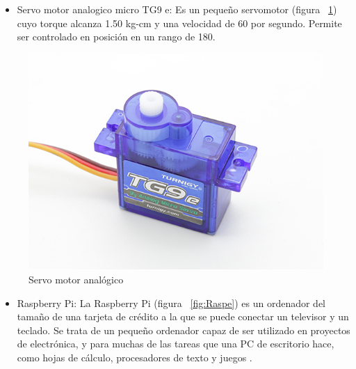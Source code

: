 \begin{itemize}
\item Servo motor analogico micro TG9 e: Es un pequeño servomotor  (figura ~\ref{fig:Servo}) cuyo torque alcanza 1.50 kg-cm y una velocidad de 60 por
segundo. Permite ser controlado en posición en un rango de 180. \cite{microservo}  

\end{itemize}

\begin{figure}[hbtp]
\centering
\label{fig:Servo}
\includegraphics[scale=0.3]{imagenes/turnigy.jpg}
\caption{Servo motor analógico}
\end{figure}

\begin{itemize}
\item Raspberry Pi: La Raspberry Pi (figura ~\ref{fig:Raspe}) es un ordenador del tamaño de una tarjeta de crédito a la que se puede conectar un 
televisor y un teclado. Se trata de un pequeño ordenador capaz de ser utilizado en proyectos de electrónica, y para muchas 
de las tareas que una PC de escritorio hace, como hojas de cálculo, procesadores de texto y juegos \cite{raspberry}. 

\end{itemize}

